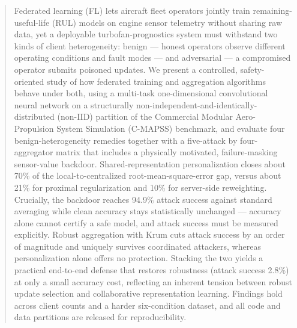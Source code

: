 \documentclass[a4paper,fleqn,doubleblind]{cas-sc}
\begin{document}
\begin{abstract}
Federated learning (FL) lets aircraft fleet operators jointly train
remaining-useful-life (RUL) models on engine sensor telemetry without
sharing raw data, yet a deployable turbofan-prognostics system must
withstand two kinds of client heterogeneity: benign --- honest
operators observe different operating conditions and fault modes ---
and adversarial --- a compromised operator submits poisoned updates.
We present a controlled, safety-oriented study of how federated
training and aggregation algorithms behave under both, using a
multi-task one-dimensional convolutional neural network on a
structurally non-independent-and-identically-distributed (non-IID)
partition of the Commercial Modular Aero-Propulsion System Simulation
(C-MAPSS) benchmark, and evaluate four benign-heterogeneity remedies
together with a five-attack by four-aggregator matrix that includes a
physically motivated, failure-masking sensor-value backdoor.
Shared-representation personalization closes about 70\% of the
local-to-centralized root-mean-square-error gap, versus about 21\%
for proximal regularization and 10\% for server-side reweighting.
Crucially, the backdoor reaches 94.9\% attack success against standard
averaging while clean accuracy stays statistically unchanged ---
accuracy alone cannot certify a safe model, and attack success must be
measured explicitly. Robust aggregation with Krum cuts attack success
by an order of magnitude and uniquely survives coordinated attackers,
whereas personalization alone offers no protection. Stacking the two
yields a practical end-to-end defense that restores robustness (attack
success 2.8\%) at only a small accuracy cost, reflecting an inherent
tension between robust update selection and collaborative
representation learning. Findings hold across client counts and a
harder six-condition dataset, and all code and data partitions are
released for reproducibility.
\end{abstract}
\end{document}
